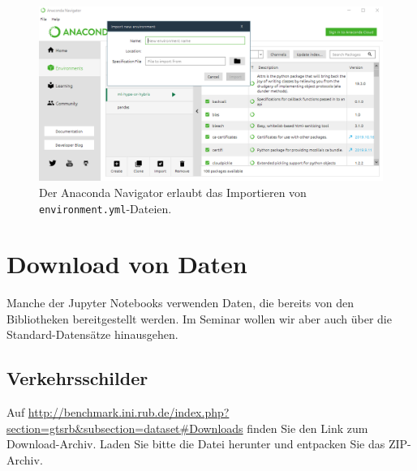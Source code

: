 \documentclass{tufte-handout}
\begin{document}
\begin{figure}[h]
  \includegraphics{anaconda-navigator}
  \caption{Der Anaconda Navigator erlaubt das Importieren von \texttt{environment.yml}-Dateien.}%
\label{fig:anaconda-navigator}
\end{figure}




\section{Download von Daten}

Manche der Jupyter Notebooks verwenden Daten, die bereits von den Bibliotheken bereitgestellt werden.
Im Seminar wollen wir aber auch über die Standard-Datensätze hinausgehen.

\subsection{Verkehrsschilder}

Auf \url{http://benchmark.ini.rub.de/index.php?section=gtsrb&subsection=dataset#Downloads} finden Sie den Link zum Download-Archiv.
Laden Sie bitte die Datei \texttt{} herunter und entpacken Sie das ZIP-Archiv.



\end{document}
